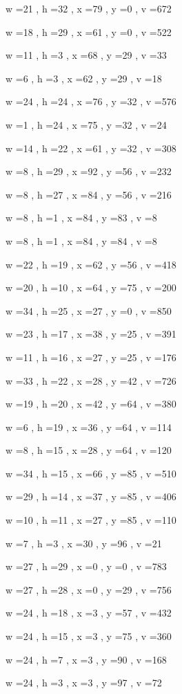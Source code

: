 \documentclass[11pt]{article}
\begin{document}
w =21 , h =32 , x =79 , y =0 , v =672
\par
w =18 , h =29 , x =61 , y =0 , v =522
\par
w =11 , h =3 , x =68 , y =29 , v =33
\par
w =6 , h =3 , x =62 , y =29 , v =18
\par
w =24 , h =24 , x =76 , y =32 , v =576
\par
w =1 , h =24 , x =75 , y =32 , v =24
\par
w =14 , h =22 , x =61 , y =32 , v =308
\par
w =8 , h =29 , x =92 , y =56 , v =232
\par
w =8 , h =27 , x =84 , y =56 , v =216
\par
w =8 , h =1 , x =84 , y =83 , v =8
\par
w =8 , h =1 , x =84 , y =84 , v =8
\par
w =22 , h =19 , x =62 , y =56 , v =418
\par
w =20 , h =10 , x =64 , y =75 , v =200
\par
w =34 , h =25 , x =27 , y =0 , v =850
\par
w =23 , h =17 , x =38 , y =25 , v =391
\par
w =11 , h =16 , x =27 , y =25 , v =176
\par
w =33 , h =22 , x =28 , y =42 , v =726
\par
w =19 , h =20 , x =42 , y =64 , v =380
\par
w =6 , h =19 , x =36 , y =64 , v =114
\par
w =8 , h =15 , x =28 , y =64 , v =120
\par
w =34 , h =15 , x =66 , y =85 , v =510
\par
w =29 , h =14 , x =37 , y =85 , v =406
\par
w =10 , h =11 , x =27 , y =85 , v =110
\par
w =7 , h =3 , x =30 , y =96 , v =21
\par
w =27 , h =29 , x =0 , y =0 , v =783
\par
w =27 , h =28 , x =0 , y =29 , v =756
\par
w =24 , h =18 , x =3 , y =57 , v =432
\par
w =24 , h =15 , x =3 , y =75 , v =360
\par
w =24 , h =7 , x =3 , y =90 , v =168
\par
w =24 , h =3 , x =3 , y =97 , v =72
\par
\newpage
\end{document}
